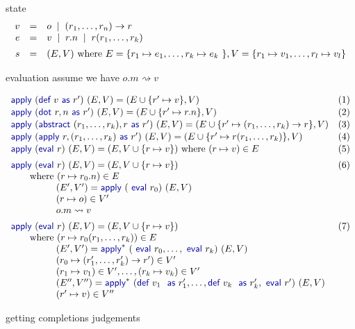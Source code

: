 \documentclass[manuscript,acmsmall,fleqn]{acmart}\settopmatter{printfolios=false,printccs=false,printacmref=false}
\theoremstyle{plain}
\theoremstyle{definition}
\newcommand{\lsep}{\;\;|\;\;}
\newcommand{\kvd}[1]{\textnormal{\textcolor{kvdclr}{\sffamily #1}}}
\begin{document}
state
\begin{equation*}
\begin{array}{rcl}
v &=& o \lsep (r_1,\ldots,r_n)\rightarrow r\\
e &=& v \lsep r.n \lsep r(r_1, \ldots, r_k)\\[0.5em]
s &=& (E, V)~\textnormal{where}~E=\{r_1\mapsto e_1, \ldots, r_k \mapsto e_k\ \}, V=\{r_1\mapsto v_1, \ldots, r_l \mapsto v_l\}
\end{array}
\end{equation*}

evaluation
assume we have $o.m \rightsquigarrow v$

\begin{equation*}
\begin{array}{ll}
\kvd{apply}~(\kvd{def}~v~\kvd{as}~r')~(E, V) = (E \cup \{r' \mapsto v\}, V) &(1)\\[0.1em]
\kvd{apply}~(\kvd{dot}~r, n~\kvd{as}~r')~(E, V) = (E \cup \{r' \mapsto r.n \}, V) &(2)\\[0.1em]
\kvd{apply}~(\kvd{abstract}~(r_1, \ldots, r_k), r~\kvd{as}~r')~(E, V) = (E \cup \{r' \mapsto (r_1, \ldots, r_k) \rightarrow r \}, V)&(3)\\[0.1em]
\kvd{apply}~(\kvd{apply}~r, (r_1, \ldots, r_k)~\kvd{as}~r')~(E, V) = (E \cup \{r' \mapsto r(r_1, \ldots, r_k) \}, V)&(4)\\[0.1em]
\kvd{apply}~(\kvd{eval}~r)~(E, V) = (E, V \cup \{ r \mapsto v \} )~\textnormal{where}~(r\mapsto v) \in E&(5)
\\[0.5em]
\kvd{apply}~(\kvd{eval}~r)~(E, V) = (E, V \cup \{ r \mapsto v \} )&(6)\\
\qquad \textnormal{where}~(r\mapsto r_0.n)\in E\\
\hspace{4.8em} (E', V') = \kvd{apply}~(\kvd{eval}~r_0)~(E, V)\\
\hspace{4.8em} (r\mapsto o) \in V'\\
\hspace{4.8em} o.m \rightsquigarrow v
\\[0.5em]
\kvd{apply}~(\kvd{eval}~r)~(E, V) = (E, V \cup \{ r \mapsto v \} )&(7)\\
\qquad \textnormal{where}~(r\mapsto r_0(r_1,\ldots, r_k)) \in E\\
\hspace{4.8em} (E', V') = \kvd{apply}^{*}~(\kvd{eval}~r_0, \ldots, \kvd{eval}~r_k)~(E, V)\\
\hspace{4.8em} (r_0 \mapsto (r'_1, \ldots, r'_k) \rightarrow r') \in V'\\
\hspace{4.8em} (r_1 \mapsto v_1) \in V', \ldots, (r_k \mapsto v_k) \in V'\\
\hspace{4.8em} (E'', V'') = \kvd{apply}^{*}~(\kvd{def}~v_1~\kvd{as}~r'_1, \ldots, \kvd{def}~v_k~\kvd{as}~r'_k, \kvd{eval}~r')~(E, V)\\
\hspace{4.8em} (r' \mapsto v) \in V''
\end{array}
\end{equation*}

getting completions judgements



\end{document}

